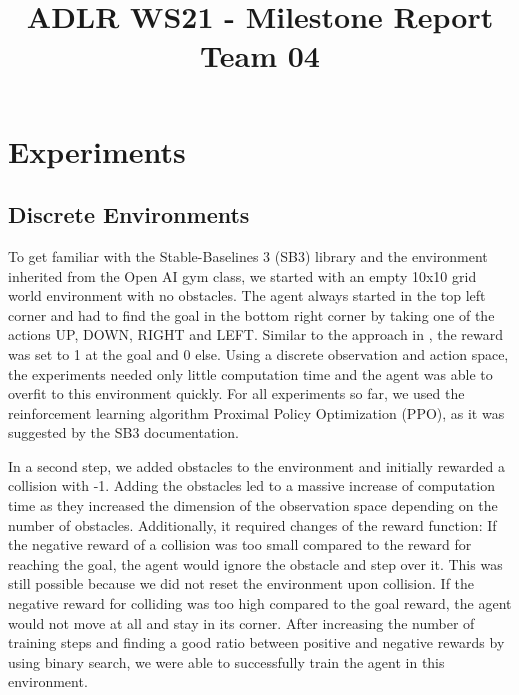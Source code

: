 \documentclass[conference]{IEEEtran}
\begin{document}
\title{ADLR WS21 - Milestone Report Team 04\\
}

\author{
\and
{}
}

\maketitle

\section{Experiments}

\subsection{Discrete Environments}

To get familiar with the Stable-Baselines 3 (SB3) library and the environment inherited from the Open AI gym class, we started with an empty 10x10 grid world environment with no obstacles. The agent always started in the top left corner and had to find the goal in the bottom right corner by taking one of the actions UP, DOWN, RIGHT and LEFT. Similar to the approach in \cite{b1}, the reward was set to 1 at the goal and 0 else. Using a discrete observation and action space, the experiments needed only little computation time and the agent was able to overfit to this environment quickly. For all experiments so far, we used the reinforcement learning algorithm Proximal Policy Optimization (PPO), as it was suggested by the SB3 documentation.

In a second step, we added obstacles to the environment and initially rewarded a collision with -1. Adding the obstacles led to a massive increase of computation time as they increased the dimension of the observation space depending on the number of obstacles. Additionally, it required changes of the reward function: If the negative reward of a collision was too small compared to the reward for reaching the goal, the agent would ignore the obstacle and step over it. This was still possible because we did not reset the environment upon collision. If the negative reward for colliding was too high compared to the goal reward, the agent would not move at all and stay in its corner. After increasing the number of training steps and finding a good ratio between positive and negative rewards by using binary search, we were able to successfully train the agent in this environment.
\end{document}
